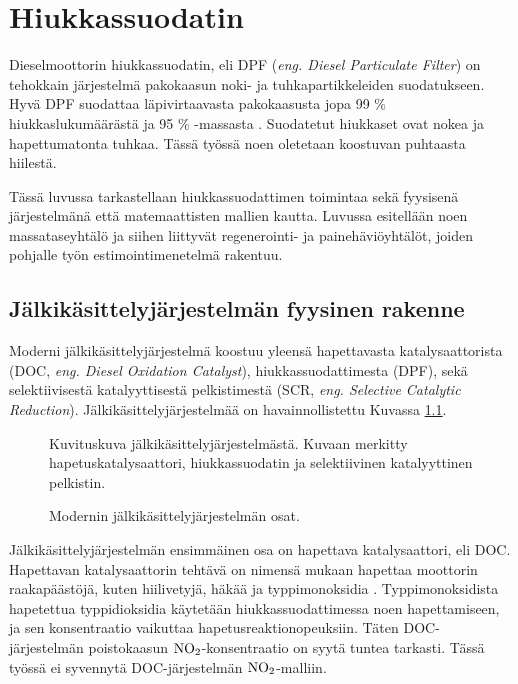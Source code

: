 \chapter{Hiukkassuodatin}%
\label{ch:dpf}



Dieselmoottorin hiukkassuodatin, eli DPF (\emph{eng. Diesel Particulate Filter}) on tehokkain järjestelmä pakokaasun noki- ja tuhkapartikkeleiden suodatukseen. 
Hyvä DPF suodattaa läpivirtaavasta pakokaasusta jopa 99 \% hiukkaslukumäärästä ja 95 \% -massasta \cite{Yan_state_of_the_art}. Suodatetut hiukkaset ovat nokea ja hapettumatonta tuhkaa. Tässä työssä noen oletetaan koostuvan puhtaasta hiilestä. 



Tässä luvussa tarkastellaan hiukkassuodattimen toimintaa sekä fyysisenä järjestelmänä että matemaattisten mallien kautta. Luvussa esitellään noen massataseyhtälö ja siihen liittyvät regenerointi- ja painehäviöyhtälöt, joiden pohjalle työn estimointimenetelmä rakentuu.


\section{Jälkikäsittelyjärjestelmän fyysinen rakenne}
Moderni jälkikäsittelyjärjestelmä koostuu yleensä hapettavasta katalysaattorista (DOC, \emph{eng. Diesel Oxidation Catalyst}), hiukkassuodattimesta (DPF), sekä selektiivisestä katalyyttisestä pelkistimestä (SCR, \emph{eng. Selective Catalytic Reduction}). 
Jälkikäsittelyjärjestelmää on havainnollistettu Kuvassa \ref{fig:EAT_full}. %
%
\begin{figure}[H]
    \centering
                {Kuvituskuva jälkikäsittelyjärjestelmästä. Kuvaan merkitty hapetuskatalysaattori, hiukkassuodatin ja selektiivinen katalyyttinen pelkistin.}
    \caption{Modernin jälkikäsittelyjärjestelmän osat.}
    \label{fig:EAT_full}
\end{figure}
%
Jälkikäsittelyjärjestelmän ensimmäinen osa on hapettava katalysaattori, eli DOC. 
Hapettavan katalysaattorin tehtävä on nimensä mukaan hapettaa moottorin raakapäästöjä, kuten hiilivetyjä, häkää ja typpimonoksidia \cite{dieselnet_doc}. Typpimonoksidista hapetettua typpidioksidia käytetään hiukkassuodattimessa noen hapettamiseen, ja sen konsentraatio vaikuttaa hapetusreaktionopeuksiin. Täten DOC-järjestelmän poistokaasun \(\ce{NO2}\)-konsentraatio on syytä tuntea tarkasti. Tässä työssä ei syvennytä DOC-järjestelmän \(\ce{NO2}\)-malliin.

